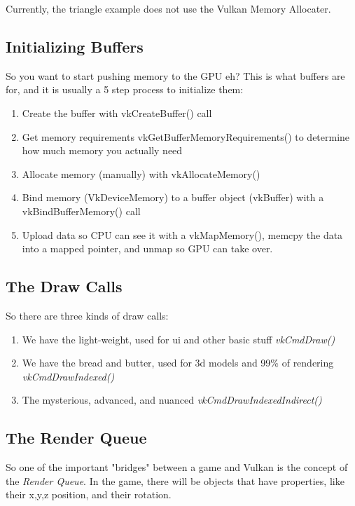 \documentclass{article}
\begin{document}
\par Currently, the triangle example does not use the Vulkan Memory Allocater.

\subsection*{Initializing
Buffers}
\par So you want to start pushing memory to the GPU eh? This is what
buffers are for, and it is usually a 5 step process to initialize them:

\begin{enumerate}
  \item Create the buffer with vkCreateBuffer() call
  \item Get memory requirements vkGetBufferMemoryRequirements() to
    determine how much memory you actually need
  \item Allocate memory (manually) with vkAllocateMemory()
  \item Bind memory (VkDeviceMemory) to a buffer object (vkBuffer)
    with a vkBindBufferMemory() call
  \item Upload data so CPU can see it with a vkMapMemory(), memcpy
    the data into a mapped pointer, and unmap so GPU can take over.
\end{enumerate}

\subsection*{The Draw Calls}
\par So there are three kinds of draw calls:

\begin{enumerate}
  \item We have the light-weight, used for ui and other basic stuff
    \textit{vkCmdDraw()}
  \item We have the bread and butter, used for 3d models and 99\% of
    rendering \textit{vkCmdDrawIndexed()}
  \item The mysterious, advanced, and nuanced
    \textit{vkCmdDrawIndexedIndirect()}
\end{enumerate}

\subsection*{The Render Queue}
\par So one of the important "bridges" between a game and Vulkan is
the concept of the \textit{Render Queue}. In the game, there will be
objects that have properties, like their x,y,z position, and their rotation.
\end{document}
